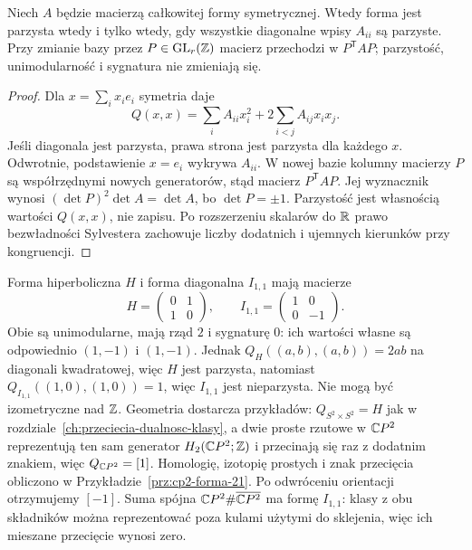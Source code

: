 \begin{stwierdzenie}
\label{prop:freedman-basis}
Niech $A$ będzie macierzą całkowitej formy symetrycznej.
Wtedy forma jest parzysta wtedy i tylko wtedy, gdy
wszystkie diagonalne wpisy $A_{ii}$ są parzyste.
Przy zmianie bazy przez $P\in\mathrm{GL}_r(\mathbb{Z})$ macierz
przechodzi w $P^{\mathsf T}AP$; parzystość,
unimodularność i sygnatura nie zmieniają się.
\end{stwierdzenie}
\begin{proof}
Dla $x=\sum_i x_i e_i$ symetria daje
\begin{equation}\label{eq:freedman-parity}
 Q(x,x)=\sum_i A_{ii}x_i^2
             +2\sum_{i<j}A_{ij}x_ix_j.
\end{equation}
Jeśli diagonala jest parzysta, prawa strona jest
parzysta dla każdego $x$. Odwrotnie, podstawienie
$x=e_i$ wykrywa $A_{ii}$. W nowej bazie kolumny
macierzy $P$ są współrzędnymi nowych generatorów,
stąd macierz $P^{\mathsf T}AP$. Jej wyznacznik wynosi
$(\det P)^2\det A=\det A$, bo $\det P=\pm1$.
Parzystość jest własnością wartości $Q(x,x)$,
nie zapisu. Po rozszerzeniu skalarów do $\mathbb{R}$
prawo bezwładności Sylvestera zachowuje liczby
dodatnich i ujemnych kierunków przy kongruencji.
\end{proof}

\begin{przyklad}
\label{prz:freedman-H-I}
Forma hiperboliczna $H$ i forma diagonalna $I_{1,1}$
mają macierze
\[
 H=\begin{pmatrix}0&1\\1&0\end{pmatrix},
 \qquad
 I_{1,1}=\begin{pmatrix}1&0\\0&-1\end{pmatrix}.
\]
Obie są unimodularne, mają rząd $2$ i sygnaturę $0$:
ich wartości własne są odpowiednio $(1,-1)$ i $(1,-1)$.
Jednak $Q_H((a,b),(a,b))=2ab$ na diagonali kwadratowej,
więc $H$ jest parzysta, natomiast
$Q_{I_{1,1}}((1,0),(1,0))=1$, więc $I_{1,1}$ jest nieparzysta.
Nie mogą być izometryczne nad $\mathbb{Z}$.
Geometria dostarcza przykładów: $Q_{S^2\times S^2}=H$
jak w rozdziale~\ref{ch:przeciecia-dualnosc-klasy},
a dwie proste rzutowe w $\mathbb{C} P^2$ reprezentują ten sam
generator $H_2(\mathbb{C} P^2;\mathbb{Z})$ i przecinają się raz z dodatnim
znakiem, więc $Q_{\mathbb{C} P^2}=[1]$. Homologię, izotopię prostych
i znak przecięcia obliczono w Przykładzie~\ref{prz:cp2-forma-21}.
Po odwróceniu orientacji otrzymujemy $[-1]$.
Suma spójna $\mathbb{C} P^2\#\overline{\mathbb{C} P^2}$
ma formę $I_{1,1}$: klasy z obu składników można
reprezentować poza kulami użytymi do sklejenia,
więc ich mieszane przecięcie wynosi zero.
\end{przyklad}

